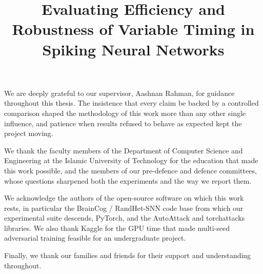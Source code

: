 \documentclass{iutbscthesis}
\title{Evaluating Efficiency and Robustness of Variable Timing in Spiking Neural Networks}
\begin{document}
\coverpage
{}
\titlepage
\declarationofcandidate


\tableofcontents
\listoffigures
\listoftables

\clearpage
\begin{abbreviations}
\end{abbreviations}

\begin{acknowledgement}
We are deeply grateful to our supervisor, Aashnan Rahman, for guidance throughout this thesis. The insistence that every claim be backed by a controlled comparison shaped the methodology of this work more than any other single influence, and patience when results refused to behave as expected kept the project moving.

We thank the faculty members of the Department of Computer Science and Engineering at the Islamic University of Technology for the education that made this work possible, and the members of our pre-defence and defence committees, whose questions sharpened both the experiments and the way we report them.

We acknowledge the authors of the open-source software on which this work rests, in particular the BrainCog / RandHet-SNN code base from which our experimental suite descends, PyTorch, and the AutoAttack and torchattacks libraries. We also thank Kaggle for the GPU time that made multi-seed adversarial training feasible for an undergraduate project.

Finally, we thank our families and friends for their support and understanding throughout.
\end{acknowledgement}
\end{document}
